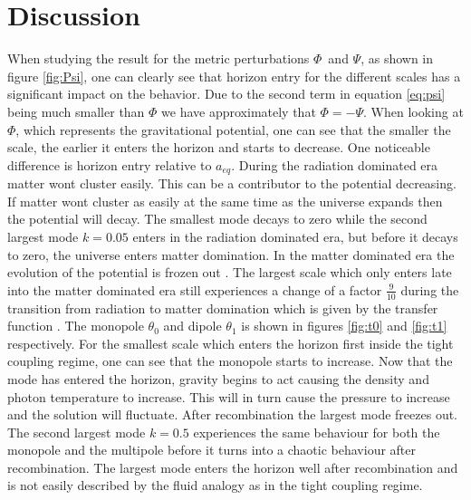 \documentclass[onecolumn]{aastex62}
\begin{document}
\section{Discussion}\label{sec:discussion}
When studying the result for the metric perturbations $\Phi$ and $\Psi$, as shown in figure \ref{fig:Psi}, one can clearly see that horizon entry for the different scales has a significant impact on the behavior. Due to the second term in equation \ref{eq:psi} being much smaller than $\Phi$ we have approximately that $\Phi=-\Psi$. When looking at $\Phi$, which represents the gravitational potential, one can see that the smaller the scale, the earlier it enters the horizon and starts to decrease. One noticeable difference is horizon entry relative to $a_{eq}$. During the radiation dominated era matter wont cluster easily. This can be a contributor to the potential decreasing. If matter wont cluster as easily at the same time as the universe expands then the potential will decay. The smallest mode decays to zero while the second largest mode $k=0.05$ enters in the radiation dominated era, but before it decays to zero, the universe enters matter domination. In the matter dominated era the evolution of the potential is frozen out \citep[p.104]{Baumann:2020}. The largest scale which only enters late into the matter dominated era still experiences a change of a factor $\frac{9}{10}$ during the transition from radiation to matter domination which is given by the transfer function \citep[p.182]{Dodelson:1282338}. The monopole $\theta_0$ and dipole $\theta_1$ is shown in figures \ref{fig:t0} and \ref{fig:t1} respectively. For the smallest scale which enters the horizon first inside the tight coupling regime, one can see that the monopole starts to increase. Now that the mode has entered the horizon, gravity begins to act causing the density and photon temperature to increase. This will in turn cause the pressure to increase and the solution will fluctuate. After recombination the largest mode freezes out. The second largest mode $k=0.5$ experiences the same behaviour for both the monopole and the multipole before it turns into a chaotic behaviour after recombination. The largest mode enters the horizon well after recombination and is not easily described by the fluid analogy as in the tight coupling regime.
\end{document}
